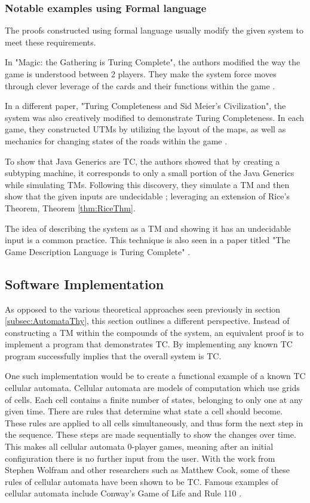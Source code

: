 \subsubsection{Notable examples using Formal language}\label{subsubsec:NotableEgsFormalLang}

The proofs constructed using formal language usually modify the given system to meet these requirements.

In "Magic: the Gathering is Turing Complete", the authors modified the way the game is understood between 2 players.
They make the system force moves through clever leverage of the cards and their functions within the game \cite{MtGTC}.

In a different paper, "Turing Completeness and Sid Meier's Civilization", the system was also creatively modified to demonstrate Turing Completeness.
In each game, they constructed UTMs by utilizing the layout of the maps, as well as mechanics for changing states of the roads within the game \cite{CivTC}.

To show that Java Generics are TC, the authors showed that by creating a subtyping machine, it corresponds to only a small portion of the Java Generics while simulating TMs.
Following this discovery, they simulate a TM and then show that the given inputs are undecidable \cite{JavaGenericsTC}; leveraging an extension of Rice's Theorem, Theorem \ref{thm:RiceThm}.

The idea of describing the system as a TM and showing it has an undecidable input is a common practice.
This technique is also seen in a paper titled "The Game Description Language is Turing Complete" \cite{GDLTC}.

\subsection{Software Implementation}\label{subsec:SoftwareImplementation}

As opposed to the various theoretical approaches seen previously in section \ref{subsec:AutomataThy}, this section outlines a different perspective.
Instead of constructing a TM within the compounds of the system, an equivalent proof is to implement a program that demonstrates TC.
By implementing any known TC program successfully implies that the overall system is TC.

One such implementation would be to create a functional example of a known TC cellular automata.
Cellular automata are models of computation which use grids of cells.
Each cell contains a finite number of states, belonging to only one at any given time.
There are rules that determine what state a cell should become.
These rules are applied to all cells simultaneously, and thus form the next step in the sequence.
These steps are made sequentially to show the changes over time.
This makes all cellular automata 0-player games, meaning after an initial configuration there is no further input from the user.
With the work from Stephen Wolfram and other researchers such as Matthew Cook, some of these rules of cellular automata have been shown to be TC.
Famous examples of cellular automata include Conway's Game of Life and Rule 110 \cite{CellAutWiki,CellAutWolfram}.

